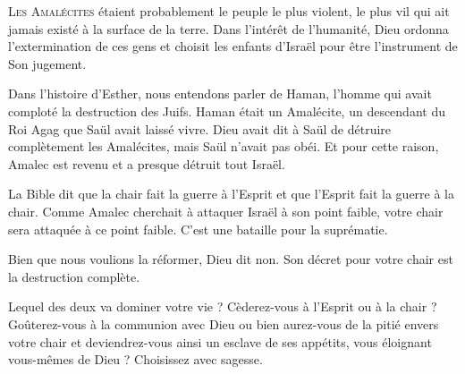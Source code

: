 \dvrule






\lettrine{L}{es Amalécites} étaient probablement le peuple le plus violent,
 le plus vil qui ait jamais existé à la surface de la terre.
 Dans l'intérêt de l'humanité, Dieu ordonna l'extermination de ces gens
 et choisit les enfants d'Israël pour être l'instrument de Son jugement.

Dans l'histoire d'Esther, nous entendons parler de Haman,
 l'homme qui avait comploté la destruction des Juifs.
 Haman était un Amalécite, un descendant du Roi Agag que Saül
 avait laissé vivre.
 Dieu avait dit à Saül de \Og détruire complètement \Fg{} les Amalécites,
 mais Saül n'avait pas obéi.
 Et pour cette raison, Amalec est revenu et a presque détruit tout Israël.

La Bible dit que la chair fait la guerre à l'Esprit et que l'Esprit
 fait la guerre à la chair.
 Comme Amalec cherchait à attaquer Israël à son point faible,
 votre chair sera attaquée à ce point faible.
 C'est une bataille pour la suprématie.


Bien que nous voulions la réformer, Dieu dit non.
 Son décret pour votre chair est la destruction complète.

Lequel des deux va dominer votre vie ?
 Cèderez-vous à l'Esprit ou à la chair ?
 Goûterez-vous à la communion avec Dieu ou bien aurez-vous
 de la pitié envers votre chair et deviendrez-vous ainsi
 un esclave de ses appétits, vous éloignant vous-mêmes de Dieu ?
 Choisissez avec sagesse. 

\dvrule



